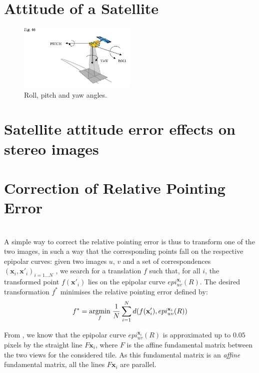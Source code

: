 \documentclass[paper=a4, fontsize=11pt, onecolumn, tikz, dvipsnames, svgnames, x11names]{article}
\begin{document}
\section{Attitude of a Satellite}

\begin{figure}[h]
    \centering
    \includegraphics[width=0.5\textwidth]{figures/angles.jpg}
   \caption{ Roll, pitch and yaw angles.}
   \label{angles}
\end{figure}

\section{Satellite attitude error effects on stereo images}
\label{sec:sensibility}

\section{Correction of Relative Pointing Error}
\cite{de2014automatic}\\

A simple way to correct the relative pointing error is thus to transform one of the two images, in such a way that the corresponding points fall on the respective epipolar curves: given two images $u$, $v$ and a set of correspondences $(\textbf{x}_i , \textbf{x}'_i)_{i=1...N}$ , we search for a translation $f$ such that, for all $i$, the transformed point $f(\textbf{x}'_i)$ lies on the epipolar curve $epi^{\textbf{x}_i}_{u v}(R)$.
The desired transformation $f^{*}$ minimises the relative pointing error defined by:
\begin{align}
\label{minif}
f^* = \underset{f}{\operatorname{argmin}}\; \dfrac{1}{N} \sum\limits_{i=1}^{N} d(f(\textbf{x}'_i), epi^{\textbf{x}_i}_{u v}(R))
\end{align}

From  \cite{de2014automatic}, we know that the epipolar curve $epi^{\textbf{x}_i}_{u v}(R)$ is approximated up to $0.05$ pixels by the straight line $F\textbf{x}_i$, where $F$ is
the affine fundamental matrix between the two views for the considered tile. As this fundamental matrix is an \textit{affine} fundamental matrix, all the lines $F\textbf{x}_i$ are parallel.
\end{document}
